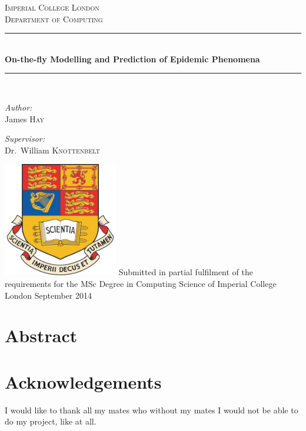 \documentclass[11pt, a4paper, oneside,titlepage]{article}
\newcommand{\HRule}{\rule{\linewidth}{0.4mm}}
\begin{document}
\begin{titlepage}
\begin{center}
	\textsc{\LARGE Imperial College London}\\[1.5cm]

	\textsc{\Large Department of Computing}\\[0.5cm]

	\HRule \\[0.4cm]
	{\LARGE \bfseries On-the-fly Modelling and Prediction of Epidemic Phenomena \\[0.4cm] }
	\HRule \\[1.5cm]

\begin{minipage}{0.4\textwidth}
\begin{flushleft} \large
\emph{Author:}\\
James \textsc{Hay}
\end{flushleft}
\end{minipage}
\begin{minipage}{0.4\textwidth}
\begin{flushright} \large
\emph{Supervisor:} \\
Dr.~William \textsc{Knottenbelt}
\end{flushright}
\end{minipage}
\vfill
\includegraphics[width=5cm]{ImperialCrest.jpg}
\vfill
Submitted in partial fulfilment of the requirements for the MSc Degree in Computing Science of Imperial College London
\vfill
{\large September 2014}
\end{center}
\end{titlepage}

\section*{Abstract}


\newpage
\section*{Acknowledgements}
I would like to thank all my mates who without my mates I would not be
able to do my project, like at all.
\end{document}
